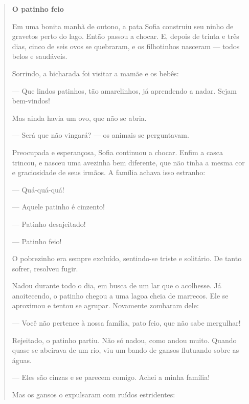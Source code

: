 \begin{escolha}
\begin{escolha}

\begin{quote}
\textbf{O patinho feio}

Em uma bonita manhã de outono, a pata Sofia construiu seu ninho de
gravetos perto do lago. Então passou a chocar. E, depois de trinta e
três dias, cinco de seis ovos se quebraram, e os filhotinhos nasceram
--- todos belos e saudáveis.

Sorrindo, a bicharada foi visitar a mamãe e os bebês:

--- Que lindos patinhos, tão amarelinhos, já aprendendo a nadar. Sejam
bem-vindos!

Mas ainda havia um ovo, que não se abria.

--- Será que não vingará? --- os animais se perguntavam.

Preocupada e esperançosa, Sofia continuou a chocar. Enfim a casca
trincou, e nasceu uma avezinha bem diferente, que não tinha a mesma cor
e graciosidade de seus irmãos. A família achava isso estranho:

--- Quá-quá-quá!

--- Aquele patinho é cinzento!

--- Patinho desajeitado!

--- Patinho feio!

O pobrezinho era sempre excluído, sentindo-se triste e solitário. De
tanto sofrer, resolveu fugir.

Nadou durante todo o dia, em busca de um lar que o acolhesse. Já
anoitecendo, o patinho chegou a uma lagoa cheia de marrecos. Ele se
aproximou e tentou se agrupar. Novamente zombaram dele:

--- Você não pertence à nossa família, pato feio, que não sabe
mergulhar!

Rejeitado, o patinho partiu. Não só nadou, como andou muito. Quando
quase se abeirava de um rio, viu um bando de gansos flutuando sobre as
águas.

--- Eles são cinzas e se parecem comigo. Achei a minha família!

Mas os gansos o expulsaram com ruídos estridentes:


\end{quote}
\end{escolha}
\end{escolha}
